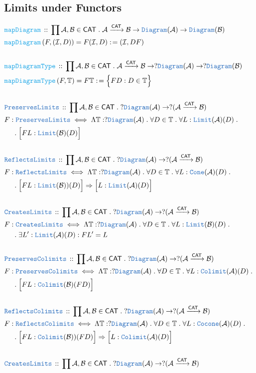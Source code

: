 \documentclass[12pt]{scrartcl}
\newcommand{\TYPE}[1]{\textcolor{NavyBlue}{\mathtt{#1}}}
\newcommand{\FUNC}[1]{\textcolor{Cerulean}{\mathtt{#1}}}
\renewcommand{\.}{\; . \;}
\newcommand{\de}{: \kern 0.1pc =}
\newcommand{\Act}[1]{\left( #1 \right)}
\newcommand{\DeclareType}[2]{& \TYPE{#1} \, :: \, #2 \\}
\newcommand{\DefineType}[3]{& #1 : \TYPE{#2} \iff #3 \\}
\newcommand{\DeclareFunc}[2]{& \FUNC{#1} \, :: \, #2 \\}
\newcommand{\DefineNamedFunc}[4]{&  \FUNC{#1}\Act{#2} = #3 \de #4 \\}
\newcommand{\NewLine}{\\ & \kern 1pc}
\newcommand{\Page}[1]{ \begin{align*} #1 \end{align*}   }
\newcommand{\Arrow}{\xrightarrow}
\newcommand{\A}{\mathcal{A}}
\newcommand{\B}{\mathcal{B}}
\newcommand{\I}{\mathcal{I}}
\newcommand{\CAT}{\mathsf{CAT}}
\begin{document}
\subsection{Limits under Functors}
\Page{
	\DeclareFunc{mapDiagram}{\prod \A,\B \in \CAT \. \A \Arrow{\CAT} \B \to \TYPE{Diagram}(\A) \to \TYPE{Diagram}(\B)}
	\DefineNamedFunc{mapDiagram }{F,(\I,D) }{F(\I,D)}{(\I,DF) }
	\\
	\DeclareFunc{mapDiagramType}{ \prod \A,\B \in \CAT \. \A \Arrow{\CAT} \B \to 
		?\TYPE{Diagram}(\A) \to ?\TYPE{Diagram}(\B)  }
	\DefineNamedFunc{mapDiagramType}{ F, \mathbb{T}  }{  F\mathbb{T}   }
	{  \Big\{ FD : D \in \mathbb{T}       \Big\}      }
	\\
	\DeclareType{PreservesLimits}{\prod \A, \B \in \CAT \. ?\TYPE{Diagram}(\A) \to ?(\A \Arrow{\CAT} \B)}
	\DefineType{F}{PreservesLimits}{
		\Lambda \mathbb{T} : ?\TYPE{Diagram}(\A) \.
		\forall  D \in \mathbb{T} \. 
		\forall  L : \TYPE{Limit}(\A)(D) \. \NewLine \.
		\Big[FL  : \TYPE{Limit}(\B)(D) \Big]
	}
	\\	
	\DeclareType{ReflectsLimits}{\prod \A, \B \in \CAT \. ?\TYPE{Diagram}(\A) \to ?(\A \Arrow{\CAT} \B)}
	\DefineType{F}{ReflectsLimits}{
		\Lambda \mathbb{T} : ?\TYPE{Diagram}(\A) \.
		\forall  D \in \mathbb{T} \. 
		\forall  L : \TYPE{Cone}(\A)(D) \. \NewLine \. 
		\Big[FL  : \TYPE{Limit}(\B))(D) \Big] \Rightarrow
		\Big[ L : \TYPE{Limit}(\A)(D) \Big ]
	}
	\\
	\DeclareType{CreatesLimits}{\prod \A, \B \in \CAT \. ?\TYPE{Diagram}(\A) \to ?(\A \Arrow{\CAT} \B)}
	\DefineType{F}{CreatesLimits}{
		\Lambda \mathbb{T} : ?\TYPE{Diagram}(\A) \.
		\forall  D \in \mathbb{T} \. 
		\forall  L : \TYPE{Limit}(\B)(D) \. \NewLine \.
		\exists  L' : \TYPE{Limit}(\A)(D) : FL' = L 
	}
	\\
	\DeclareType{PreservesColimits}{\prod \A, \B \in \CAT \. ?\TYPE{Diagram}(\A) \to ?(\A \Arrow{\CAT} \B)}
	\DefineType{F}{PreservesColimits}{
		\Lambda \mathbb{T} : ?\TYPE{Diagram}(\A) \.
		\forall  D \in \mathbb{T} \. 
		\forall  L : \TYPE{Colimit}(\A)(D) \. \NewLine \.
		\Big[FL  : \TYPE{Colimit}(\B)(FD) \Big]
	}
	\\	
	\DeclareType{ReflectsColimits}{\prod \A, \B \in \CAT \. ?\TYPE{Diagram}(\A) \to ?(\A \Arrow{\CAT} \B)}
	\DefineType{F}{ReflectsColimits}{
		\Lambda \mathbb{T} : ?\TYPE{Diagram}(\A) \.
		\forall  D \in \mathbb{T} \. 
		\forall  L : \TYPE{Cocone}(\A)(D) \. \NewLine \. 
		\Big[FL  : \TYPE{Colimit}(\B))(FD) \Big] \Rightarrow
		\Big[ L : \TYPE{Colimit}(\A)(D) \Big ]
	}
	\\
	\DeclareType{CreatesLimits}{\prod \A, \B \in \CAT \. ?\TYPE{Diagram}(\A) \to ?(\A \Arrow{\CAT} \B)}
}
\end{document}

